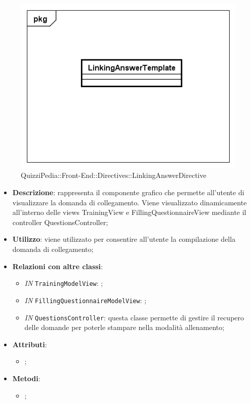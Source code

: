 		\begin{figure}[ht]
			\centering
			\includegraphics[scale=0.5,keepaspectratio]{UML/Classi/Front-End/QuizziPedia_Front-end_Templates_LinkingAnswerTemplate.png}
			\caption{QuizziPedia::Front-End::Directives::LinkingAnswerDirective}
		\end{figure} \FloatBarrier		
		
		\begin{itemize}
			\item \textbf{Descrizione}: rappresenta il componente grafico che permette all'utente di visualizzare la domanda di collegamento. Viene visualizzato dinamicamente all'interno delle views TrainingView e FillingQuestionnaireView mediante il controller QuestionsController;
			\item \textbf{Utilizzo}: viene utilizzato per consentire all'utente la compilazione della domanda di collegamento;
			\item \textbf{Relazioni con altre classi}: 
			\begin{itemize}
				\item \textit{IN} \texttt{TrainingModelView}: ; 
				\item \textit{IN} \texttt{FillingQuestionnaireModelView}: ;
				\item \textit{IN} \texttt{QuestionsController}: questa classe permette di gestire il recupero delle domande per poterle stampare nella modalità allenamento;
			\end{itemize}
			\item \textbf{Attributi}: 
			\begin{itemize}
				\item ;
			\end{itemize}
			\item \textbf{Metodi}: 
			\begin{itemize}
				\item ;
			\end{itemize}
		\end{itemize}
		

